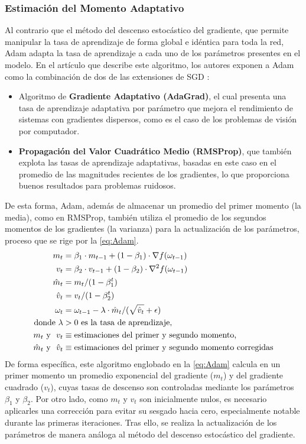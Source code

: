 \subsubsection{Estimación del Momento Adaptativo} \label{Chapter:Adam}

Al contrario que el método del descenso estocástico del gradiente, que permite manipular la tasa de aprendizaje de forma global e idéntica para toda la red, Adam adapta la tasa de aprendizaje a cada uno de los parámetros presentes en el modelo. En el artículo que describe este algoritmo, los autores exponen a Adam como la combinación de dos de las extensiones de SGD \cite{Adam}:
\begin{itemize}
  \item Algoritmo de \textbf{Gradiente Adaptativo (AdaGrad)}, el cual presenta una tasa de aprendizaje adaptativa por parámetro que mejora el rendimiento de sistemas con gradientes dispersos, como es el caso de los problemas de visión por computador. 
  \item \textbf{Propagación del Valor Cuadrático Medio (RMSProp)}, que también explota las tasas de aprendizaje adaptativas, basadas en este caso en el promedio de las magnitudes recientes de los gradientes, lo que proporciona buenos resultados para problemas ruidosos. 
\end{itemize}

De esta forma, Adam, además de almacenar un promedio del primer momento (la media), como en RMSProp, también utiliza el promedio de los segundos momentos de los gradientes (la varianza) para la actualización de los parámetros, proceso que se rige por la \autoref{eq:Adam}.
\begin{align}
    m_t &= \beta_1 \cdot m_{t-1} + (1 - \beta_1) \cdot \nabla f(\omega_{t-1}) \label{eq:AdamBeta1}\\
    v_t &= \beta_2 \cdot v_{t-1} + (1 - \beta_2) \cdot \nabla^2 f(\omega_{t-1}) \label{eq:AdamBeta2}\\
    \hat{m}_t &= m_t / (1 - \beta_1^t) \\
    \hat{v}_t &= v_t / (1 - \beta_2^t) \\
    \omega_t &= \omega_{t-1} - \lambda \cdot \hat{m}_t / (\sqrt{\hat{v}_t} + \epsilon) \label{eq:Adam} \\
    \text{donde}~
    \lambda &> 0 \text{\space es la tasa de aprendizaje,} \notag \\
    m_t \text{\space y \space} v_t &\equiv \text{estimaciones del primer y segundo momento,} \notag \\
    \hat{m}_t \text{\space y \space} \hat{v}_t &\equiv \text{estimaciones del primer y segundo momento corregidas} \notag
\end{align}
De forma específica, este algoritmo englobado en la \autoref{eq:Adam} calcula en un primer momento un promedio exponencial del gradiente ($m_t$) y del gradiente cuadrado ($v_t$), cuyas tasas de descenso son controladas mediante los parámetros $\beta_1$ y $\beta_2$. Por otro lado, como $m_t$ y $v_t$ son inicialmente nulos, es necesario aplicarles una corrección para evitar su sesgado hacia cero, especialmente notable durante las primeras iteraciones. Tras ello, se realiza la actualización de los parámetros de manera análoga al método del descenso estocástico del gradiente.

